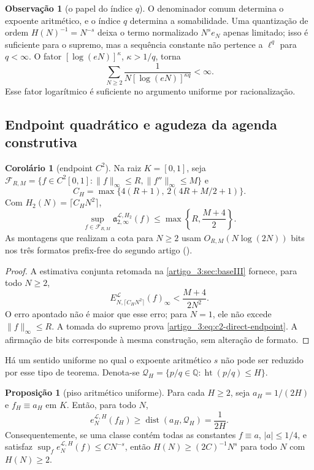 \documentclass[12pt,a4paper]{article}
\makeatletter
\theoremstyle{preciso}
\theoremstyle{definition}
\newcommand{\Library}{\mathcal{L}}
\newcommand{\height}{\operatorname{ht}}
\theoremstyle{preciso}
\theoremstyle{preciso}
\theoremstyle{preciso}
\newtheorem{proposition}[teorema]{Proposição}
\theoremstyle{preciso}
\newtheorem{corollary}[teorema]{Corolário}
\theoremstyle{definition}
\theoremstyle{preciso}
\theoremstyle{definition}
\newtheorem{remark}[teorema]{Observação}
\theoremstyle{preciso}
\theoremstyle{preciso}
\theoremstyle{definition}
\newcommand{\abntlookup}[2]{\ifcsname ab#1@#2\endcsname\csname ab#1@#2\endcsname\else\textbf{??}\PackageWarning{abnt}{Citacao indefinida: #2}\fi}
\newcommand{\abntpar}[1]{\hyperlink{bib:#1}{\abntlookup{U}{#1}, \abntlookup{Y}{#1}}}
\newcommand{\abntsep}{}
\newcommand{\abntpitem}[1]{\abntsep\renewcommand{\abntsep}{; }\abntpar{#1}}
\newcommand{\citep}[2][]{\begingroup\renewcommand{\abntsep}{}(\forcsvlist{\abntpitem}{#2}\ifblank{#1}{}{, #1})\endgroup}
\makeatother
\begin{document}
\begin{remark}[o papel do índice $q$]\label{map:artigo_3:4.4}
\label{artigo_3:rem:q-height-role}
O denominador comum determina o expoente aritmético, e o índice $q$ determina
a somabilidade. Uma quantização de ordem
$H(N)^{-1}=N^{-s}$ deixa o termo normalizado $N^se_N$ apenas limitado; isso
é suficiente para o supremo, mas a sequência constante não pertence a
$\ell^q$ para $q<\infty$. O fator $[\log(eN)]^\kappa$, $\kappa>1/q$, torna
\[
 \sum_{N\ge2}\frac1{N[\log(eN)]^{\kappa q}}<\infty.
\]
Esse fator logarítmico é suficiente no argumento uniforme por
racionalização.
\end{remark}

\subsection{Endpoint quadrático e agudeza da agenda construtiva}

\begin{corollary}[endpoint $C^2$]\label{map:artigo_3:4.5}
\label{artigo_3:cor:c2-direct-endpoint}
Na raiz $K=[0,1]$, seja
$\mathcal F_{R,M}=\{f\in C^2[0,1]:\|f\|_\infty\le R,
\|f''\|_\infty\le M\}$ e
\[
 C_H=\max\{4(R+1),\,2(4R+M/2+1)\}.
\]
Com $H_2(N)=\lceil C_HN^2\rceil$,
\begin{equation}
 \sup_{f\in\mathcal F_{R,M}}
 \mathfrak a_{2,\infty}^{\Library,H_2}(f)
 \le\max\left\{R,\frac{M+4}{2}\right\}.
 \label{artigo_3:eq:c2-direct-endpoint}
\end{equation}
As montagens que realizam a cota para $N\ge2$ usam
$O_{R,M}(N\log(2N))$ bits nos três formatos prefix-free do
segundo artigo \citep{artigo_2-oliveiraII}.
\end{corollary}

\begin{proof}
A estimativa conjunta retomada na \cref{artigo_3:sec:baseIII} fornece, para todo $N\ge2$,
\[
 E_{N,\lceil C_HN^2\rceil}^{\Library}(f)_\infty
 <\frac{M+4}{2N^2}.
\]
O erro apontado não é maior que esse erro; para $N=1$, ele não excede
$\|f\|_\infty\le R$. A tomada do supremo prova
\eqref{artigo_3:eq:c2-direct-endpoint}. A afirmação de bits corresponde à mesma construção,
sem alteração de formato.
\end{proof}

Há um sentido uniforme no qual o expoente aritmético $s$ não pode ser
reduzido por esse tipo de teorema. Denota-se
$\mathcal Q_H=\{p/q\in\mathbb Q:\height(p/q)\le H\}$.

\begin{proposition}[piso aritmético uniforme]\label{map:artigo_3:4.6}
\label{artigo_3:prop:arithmetic-floor}
Para cada $H\ge2$, seja $a_H=1/(2H)$ e $f_H\equiv a_H$ em $K$. Então, para
todo $N$,
\begin{equation}
 e_N^{\Library,H}(f_H)
 \ge\operatorname{dist}(a_H,\mathcal Q_H)
 =\frac1{2H}.
 \label{artigo_3:eq:arithmetic-floor}
\end{equation}
Consequentemente, se uma classe contém todas as constantes
$f\equiv a$, $|a|\le1/4$, e satisfaz
$\sup_f e_N^{\Library,H}(f)\le C N^{-s}$, então
$H(N)\ge(2C)^{-1}N^s$ para todo $N$ com $H(N)\ge2$.
\end{proposition}
\end{document}
